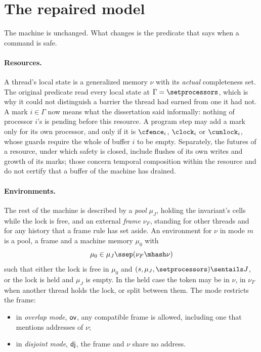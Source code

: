 \section{The repaired model}
\label{sec:model}

The machine is unchanged. What changes is the predicate that says when a
command is safe.

\paragraph{Resources.}
A thread's local state is a generalized memory $\nu$ with its \emph{actual}
completeness set. The original predicate read every local state at
$\Gamma = \setprocessors$, which is why it could not distinguish a barrier
the thread had earned from one it had not. A mark $i \in \Gamma$ now means
what the dissertation said informally: nothing of processor $i$'s is
pending before this resource. A program step may add a mark
only for its own processor, and only if it is $\cfence_i$, $\clock_i$ or
$\cunlock_i$, whose guards require the whole of buffer $i$ to be empty.
Separately, the futures of a resource, under which safety is closed,
include flushes of its own writes and growth of its marks; those concern
temporal composition within the resource and do not certify that a buffer
of the machine has drained.

\paragraph{Environments.}
The rest of the machine is described by a \emph{pool} $\mu_J$, holding the
invariant's cells while the lock is free, and an external \emph{frame}
$\nu_F$, standing for other threads and for any history that a frame rule
has set aside. An environment for $\nu$ in mode $m$ is a pool, a frame and
a machine memory $\mu_0$ with
\[
  \mu_0 \in \mu_J \ssep (\nu_F \mhash \nu)
\]
such that either the lock is free in $\mu_0$ and
$(s,\mu_J,\setprocessors) \sentails J$, or the lock is held and $\mu_J$ is
empty. In the held case the token may be in $\nu$, in $\nu_F$ when another
thread holds the lock, or split between them. The mode restricts the frame:
\begin{itemize}[nosep]
  \item in \emph{overlap mode}, $\mathsf{ov}$, any compatible frame is allowed,
        including one that mentions addresses of $\nu$;
  \item in \emph{disjoint mode}, $\mathsf{dj}$, the frame and $\nu$ share no
        address.
\end{itemize}

